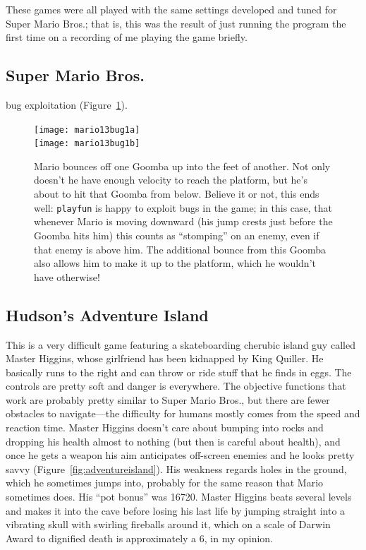 \documentclass[twocolumn]{article}
\begin{document}
These games were all played with the same settings developed and tuned
for Super Mario Bros.; that is, this was the result of just running
the program the first time on a recording of me playing the game
briefly.

\subsection{Super Mario Bros.}

bug exploitation (Figure~\ref{fig:mario13bug1}).

\begin{figure}[h!tb]
\begin{center}
\texttt{[image: mario13bug1a]} \\[0.3em]
\texttt{[image: mario13bug1b]}
\end{center}\vspace{-0.1in}
\caption{Mario bounces off one Goomba up into the feet of another. Not
  only doesn't he have enough velocity to reach the platform, but he's
  about to hit that Goomba from below. Believe it or not, this ends
  well: {\tt playfun} is happy to exploit bugs in the game; in this case,
  that whenever Mario is moving downward (his jump crests just before the
  Goomba hits him) this counts as ``stomping'' on an enemy, even if that
  enemy is above him. The additional bounce from this Goomba also allows
  him to make it up to the platform, which he wouldn't have otherwise!
}
\label{fig:mario13bug1}
\end{figure}


\subsection{Hudson's Adventure Island}

This is a very difficult game featuring a skateboarding cherubic
island guy called Master Higgins, whose girlfriend has been kidnapped
by King Quiller. He basically runs to the right and can throw or ride
stuff that he finds in eggs. The controls are pretty soft and danger
is everywhere. The objective functions that work are probably pretty
similar to Super Mario Bros., but there are fewer obstacles to
navigate---the difficulty for humans mostly comes from the speed and
reaction time. Master Higgins doesn't care about bumping into rocks
and dropping his health almost to nothing (but then is careful about
health), and once he gets a weapon his aim anticipates off-screen
enemies and he looks pretty savvy (Figure~\ref{fig:adventureisland}).
His weakness regards holes in the ground, which he sometimes jumps
into, probably for the same reason that Mario sometimes does. His
``pot bonus'' was 16720. Master Higgins beats several levels and makes
it into the cave before losing his last life by jumping straight into
a vibrating skull with swirling fireballs around it, which on a scale
of Darwin Award to dignified death is approximately a 6, in my
opinion.
\end{document}
